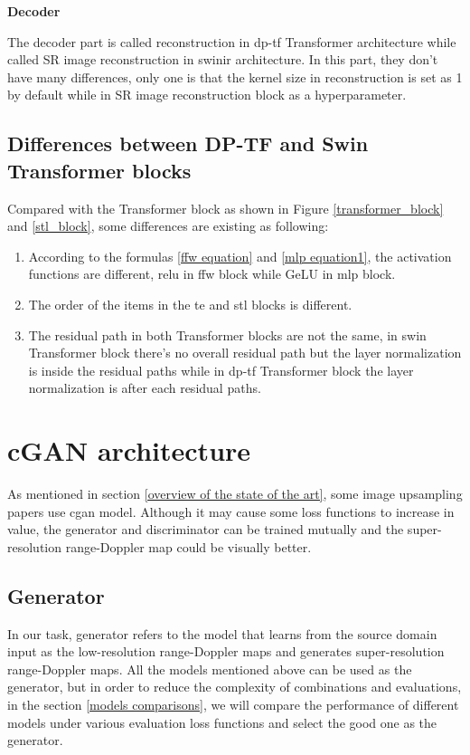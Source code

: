 \begin{spacing}{1.5}
\textbf{\large{Decoder}}
\end{spacing}
The decoder part is called reconstruction in \gls{dp}-\gls{tf} Transformer architecture while called SR image reconstruction in \gls{swinir} architecture. In this part, they don't have many differences, only one is that the kernel size in reconstruction is set as 1 by default while in SR image reconstruction block as a hyperparameter.

\subsection{Differences between DP-TF and Swin Transformer blocks}
Compared with the Transformer block as shown in Figure \ref{transformer_block} and \ref{stl_block}, some differences are existing as following:

\begin{enumerate}[start=10]
    \item According to the formulas \ref{ffw equation} and \ref{mlp equation1}, the activation functions are different, \gls{relu} in \gls{ffw} block while GeLU in \gls{mlp} block.
    \item The order of the items in the \gls{te} and \gls{stl} blocks is different.
    \item The residual path in both Transformer blocks are not the same, in \gls{swin} Transformer block there's no overall residual path but the layer normalization is inside the residual paths while in \gls{dp}-\gls{tf} Transformer block the layer normalization is after each residual paths.
\end{enumerate}

\section{cGAN architecture} \label{cgan architecture}
As mentioned in section \ref{overview of the state of the art}, some image upsampling papers use \gls{cgan} model. Although it may cause some loss functions to increase in value, the generator and discriminator can be trained mutually and the super-resolution range-Doppler map could be visually better.

\subsection{Generator} \label{generator}
In our task, generator refers to the model that learns from the source domain input as the low-resolution range-Doppler maps and generates super-resolution range-Doppler maps. All the models mentioned above can be used as the generator, but in order to reduce the complexity of combinations and evaluations, in the section \ref{models comparisons}, we will compare the performance of different models under various evaluation loss functions and select the good one as the generator.

